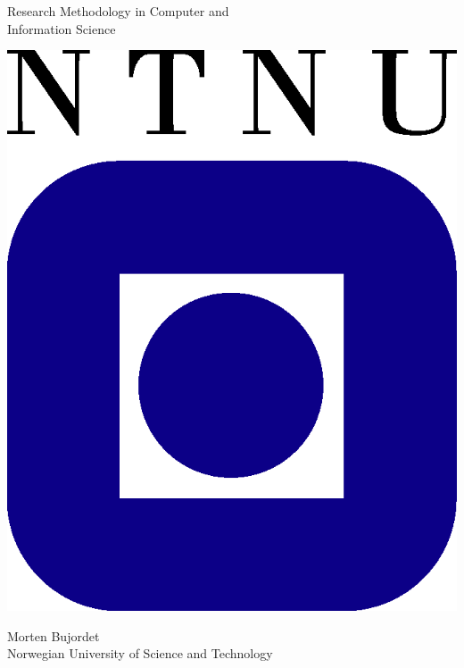 \begin{titlepage}
\begin{center}

    
  {\Huge Research Methodology in Computer and}\\[0.3cm]
  {\Huge Information Science} \\


  
  \vspace{3.0cm}

  \includegraphics{ntnu-logo2.png}

  \vspace{4.0cm}

  {\Large Morten Bujordet} \\ [0.5cm]
  {\Large Norwegian University of Science and Technology}\\

  \vspace{4cm}

 


\end{center}
\end{titlepage}